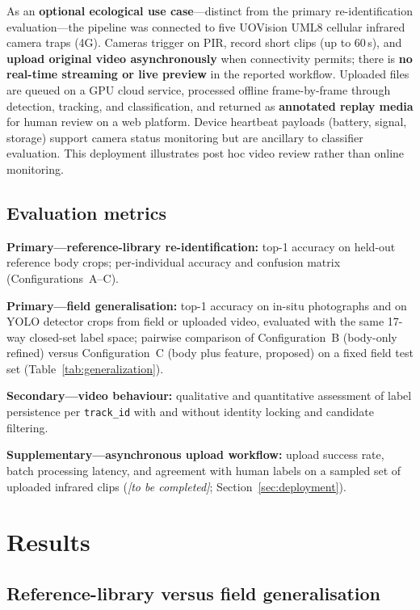 \documentclass[preprint,12pt,3p,times]{elsarticle}
\begin{document}
As an \textbf{optional ecological use case}---distinct from the primary re-identification evaluation---the pipeline was connected to five UOVision UML8 cellular infrared camera traps (4G). Cameras trigger on PIR, record short clips (up to 60\,s), and \textbf{upload original video asynchronously} when connectivity permits; there is \textbf{no real-time streaming or live preview} in the reported workflow. Uploaded files are queued on a GPU cloud service, processed offline frame-by-frame through detection, tracking, and classification, and returned as \textbf{annotated replay media} for human review on a web platform. Device heartbeat payloads (battery, signal, storage) support camera status monitoring but are ancillary to classifier evaluation. This deployment illustrates post hoc video review rather than online monitoring.

\subsection{Evaluation metrics}

\textbf{Primary---reference-library re-identification:} top-1 accuracy on held-out reference body crops; per-individual accuracy and confusion matrix (Configurations~A--C).

\textbf{Primary---field generalisation:} top-1 accuracy on in-situ photographs and on YOLO detector crops from field or uploaded video, evaluated with the same 17-way closed-set label space; pairwise comparison of Configuration~B (body-only refined) versus Configuration~C (body plus feature, proposed) on a fixed field test set (Table~\ref{tab:generalization}).

\textbf{Secondary---video behaviour:} qualitative and quantitative assessment of label persistence per \texttt{track\_id} with and without identity locking and candidate filtering.

\textbf{Supplementary---asynchronous upload workflow:} upload success rate, batch processing latency, and agreement with human labels on a sampled set of uploaded infrared clips (\textit{[to be completed]}; Section~\ref{sec:deployment}).

\section{Results}
\label{sec:results}

\subsection{Reference-library versus field generalisation}
\end{document}
